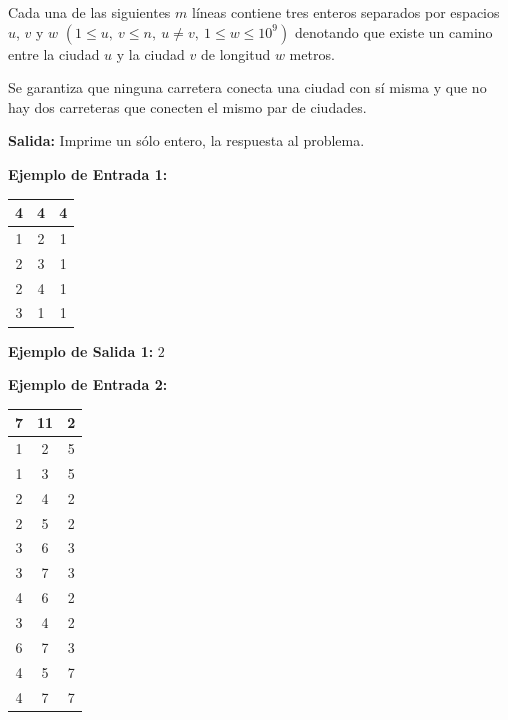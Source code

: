 \documentclass[12pt]{article}
\newcommand{\nl}{\vspace{0.3cm}}
\begin{document}
\nl

Cada una de las siguientes $m$ líneas contiene tres enteros separados por espacios $u$, $v$ y $w$ $ ( 1 \leqslant u,\ v \leqslant n,\ u \neq v,\ 1 \leqslant w \leqslant 10^9 ) $ denotando que existe un camino entre la ciudad $u$ y la ciudad $v$ de longitud $w$ metros.

\nl

Se garantiza que ninguna carretera conecta una ciudad con sí misma y que no hay dos carreteras que conecten el mismo par de ciudades.

\nl

\textbf{Salida:} Imprime un sólo entero, la respuesta al problema.

\nl

\textbf{Ejemplo de Entrada 1:}

\nl

\begin{tabular}{|c|c|c|}
	\hline 4 & 4 & 4 \\ 
	\hline 1 & 2 & 1 \\ 
	\hline 2 & 3 & 1 \\ 
	\hline 2 & 4 & 1 \\ 
	\hline 3 & 1 & 1 \\ 
	\hline 
\end{tabular} 

\nl

\textbf{Ejemplo de Salida 1:} $2$

\newpage

\textbf{Ejemplo de Entrada 2:}

\nl

\begin{tabular}{|c|c|c|}
	\hline 7 & 11 & 2 \\ 
	\hline 1 & 2 & 5 \\ 
	\hline 1 & 3 & 5 \\ 
	\hline 2 & 4 & 2 \\ 
	\hline 2 & 5 & 2 \\ 
	\hline 3 & 6 & 3 \\ 
	\hline 3 & 7 & 3 \\ 
	\hline 4 & 6 & 2 \\ 
	\hline 3 & 4 & 2 \\ 
	\hline 6 & 7 & 3 \\ 
	\hline 4 & 5 & 7 \\ 
	\hline 4 & 7 & 7 \\ 
	\hline 
\end{tabular} 

\nl
\end{document}
